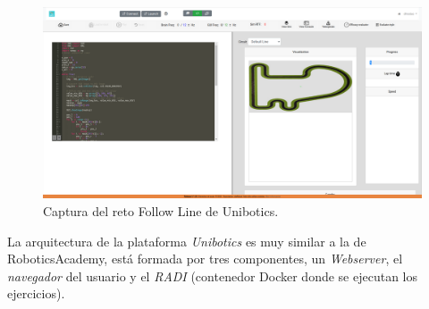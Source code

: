 \documentclass[a4paper, 12pt]{book}
\begin{document}
\begin{figure}[H]
	\centering
    \includegraphics[width=15cm]{img/follow_line.png}
    \caption{Captura del reto Follow Line de Unibotics.}
    \label{figura:unibotics_architecture}
\end{figure}

La arquitectura de la plataforma \emph{Unibotics} es muy similar a la de RoboticsAcademy, está formada por tres componentes, un \emph{Webserver}, el \emph{navegador} del usuario y el \emph{RADI} (contenedor Docker donde se ejecutan los ejercicios).
\end{document}
